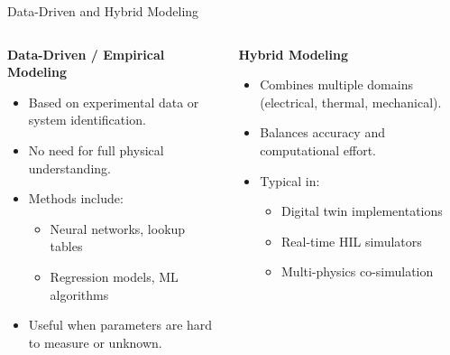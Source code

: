 \begin{frame}{Data-Driven and Hybrid Modeling}
    \begin{columns}
        \begin{column}{0.5\textwidth}
            \textbf{Data-Driven / Empirical Modeling}
            \begin{itemize}
                \item Based on experimental data or system identification.
                \item No need for full physical understanding.
                \item Methods include:
                \begin{itemize}
                    \item Neural networks, lookup tables
                    \item Regression models, ML algorithms
                \end{itemize}
                \item Useful when parameters are hard to measure or unknown.
            \end{itemize}
        \end{column}
        \begin{column}{0.5\textwidth}
            \textbf{Hybrid Modeling}
            \begin{itemize}
                \item Combines multiple domains (electrical, thermal, mechanical).
                \item Balances accuracy and computational effort.
                \item Typical in:
                \begin{itemize}
                    \item Digital twin implementations
                    \item Real-time HIL simulators
                    \item Multi-physics co-simulation
                \end{itemize}
            \end{itemize}
        \end{column}
    \end{columns}
\end{frame}




